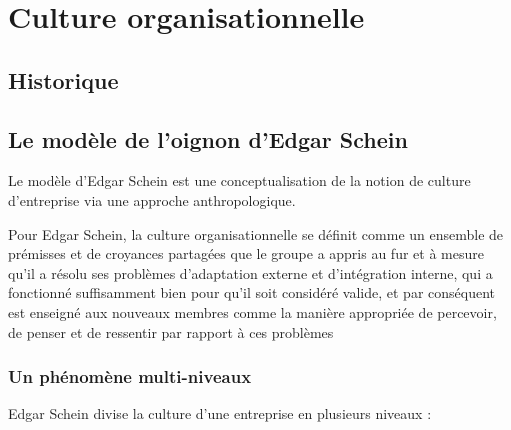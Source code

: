 \documentclass[12pt]{article}
\begin{document}
\section{Culture organisationnelle}
	\subsection{Historique}
	\subsection{Le modèle de l'oignon d'Edgar Schein}
	
	Le modèle d'Edgar Schein est une conceptualisation de la notion de culture d'entreprise via une approche anthropologique.
	
	Pour Edgar Schein, la culture organisationnelle se définit comme \og{} un ensemble de prémisses et de croyances partagées que le groupe a appris au fur et à mesure qu'il a résolu ses problèmes d'adaptation externe et d'intégration interne, qui a fonctionné suffisamment bien pour qu'il soit considéré valide, et par conséquent est enseigné aux nouveaux membres comme la manière appropriée de percevoir, de penser et de ressentir par rapport à ces problèmes \fg{} \cite{schein2010}
	
	  \subsubsection{Un phénomène multi-niveaux}
	  
	  Edgar Schein divise la culture d'une entreprise en plusieurs niveaux :
	  
\end{document}
